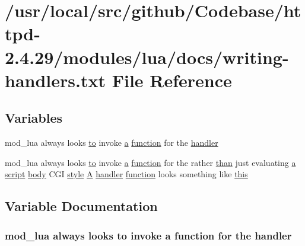 \hypertarget{writing-handlers_8txt}{}\section{/usr/local/src/github/\+Codebase/httpd-\/2.4.29/modules/lua/docs/writing-\/handlers.txt File Reference}
\label{writing-handlers_8txt}
\subsection*{Variables}
\begin{DoxyCompactItemize}
\item 
mod\+\_\+lua always looks \hyperlink{pcretest_8txt_aa22c98f630e4b3fe86ee17ce5150c62f}{to} invoke \hyperlink{pcre_8txt_a841271aab70f5cda9412a19c7753f02c}{a} \hyperlink{pcretest_8txt_abd306f12a46ac3f6be69579bceb817d0}{function} for the \hyperlink{writing-handlers_8txt_a06375414bd03dc9c48eab0f361ada458}{handler}
\item 
mod\+\_\+lua always looks \hyperlink{pcretest_8txt_aa22c98f630e4b3fe86ee17ce5150c62f}{to} invoke \hyperlink{pcre_8txt_a841271aab70f5cda9412a19c7753f02c}{a} \hyperlink{pcretest_8txt_abd306f12a46ac3f6be69579bceb817d0}{function} for the rather \hyperlink{pcre_8txt_af2fdb07d3097b68fca970a5c282c7680}{than} just evaluating \hyperlink{pcre_8txt_a841271aab70f5cda9412a19c7753f02c}{a} \hyperlink{basic-configuration_8txt_ac1048f198f179d52eda77c5ed6ab9ba9}{script} \hyperlink{group__MOD__DAV_gac4ba05af5940fc47e3b0aa0a79eb4bdc}{body} C\+GI \hyperlink{group__APR__Util__XML_gac1f70a476bd79849143813436ef34a26}{style} \hyperlink{pcregrep_8txt_ae7af65aae7738174b8f4c0662da372d5}{A} \hyperlink{writing-handlers_8txt_a06375414bd03dc9c48eab0f361ada458}{handler} \hyperlink{pcretest_8txt_abd306f12a46ac3f6be69579bceb817d0}{function} looks something like \hyperlink{writing-handlers_8txt_a1578efb5178d735b3ed21720d664c84b}{this}
\end{DoxyCompactItemize}


\subsection{Variable Documentation}
\subsubsection[{\texorpdfstring{handler}{handler}}]{\setlength{\rightskip}{0pt plus 5cm}mod\+\_\+lua always looks {\bf to} invoke {\bf a} {\bf function} for the handler}\hypertarget{writing-handlers_8txt_a06375414bd03dc9c48eab0f361ada458}{}\label{writing-handlers_8txt_a06375414bd03dc9c48eab0f361ada458}
